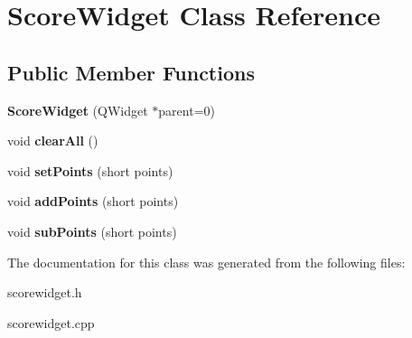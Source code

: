 \hypertarget{classScoreWidget}{
\section{ScoreWidget Class Reference}
\label{classScoreWidget}
}
\subsection*{Public Member Functions}
\begin{DoxyCompactItemize}
\item 
\hypertarget{classScoreWidget_ab0a92bcadf24e51e0095e23a34fb24f4}{
{\bfseries ScoreWidget} (QWidget $\ast$parent=0)}
\label{classScoreWidget_ab0a92bcadf24e51e0095e23a34fb24f4}

\item 
\hypertarget{classScoreWidget_aa0757e0f2462398599a53d76210c0c4f}{
void {\bfseries clearAll} ()}
\label{classScoreWidget_aa0757e0f2462398599a53d76210c0c4f}

\item 
\hypertarget{classScoreWidget_a655a3acc94522cd67903f31a50b0c500}{
void {\bfseries setPoints} (short points)}
\label{classScoreWidget_a655a3acc94522cd67903f31a50b0c500}

\item 
\hypertarget{classScoreWidget_a5ebeb6d4e98854e60e5cdcb5f284d88a}{
void {\bfseries addPoints} (short points)}
\label{classScoreWidget_a5ebeb6d4e98854e60e5cdcb5f284d88a}

\item 
\hypertarget{classScoreWidget_ad77165e25e248c75bf1bc37e82dc6421}{
void {\bfseries subPoints} (short points)}
\label{classScoreWidget_ad77165e25e248c75bf1bc37e82dc6421}

\end{DoxyCompactItemize}


The documentation for this class was generated from the following files:\begin{DoxyCompactItemize}
\item 
scorewidget.h\item 
scorewidget.cpp\end{DoxyCompactItemize}
